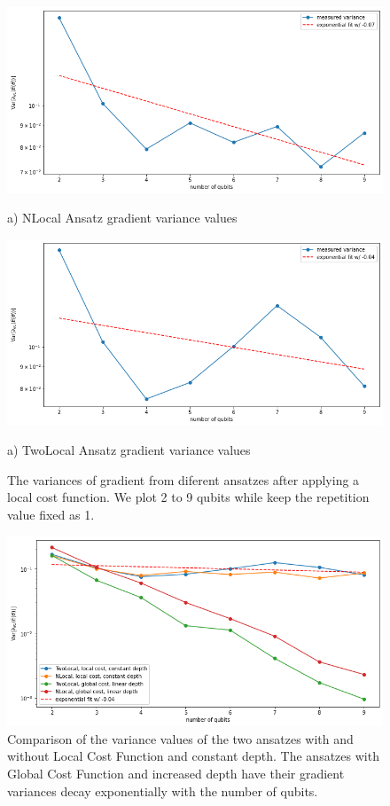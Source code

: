 \begin{figure}
    \includegraphics[width=\textwidth]{Artefact/Appendices/NLocalFixedLocal.png}
    \centerline{a) NLocal Ansatz gradient variance values}
    \includegraphics[width=\textwidth]{Artefact/Appendices/TwoLocalFixedLocal.png}
    \centerline{a) TwoLocal Ansatz gradient variance values}
    \caption{
        The variances of gradient from diferent ansatzes after applying a local cost function.
        We plot 2 to 9 qubits while keep the repetition value fixed as 1. 
    }
\end{figure}

\begin{figure}
    \includegraphics[width=\textwidth]{Artefact/Appendices/variancesLCF.png}
    \caption{
        Comparison of the variance values of the two ansatzes with and without Local Cost Function and constant depth.
        The ansatzes with Global Cost Function and increased depth have their gradient variances decay exponentially with the number of qubits. 
    }
    \label{Variance Local Cost}
\end{figure}
